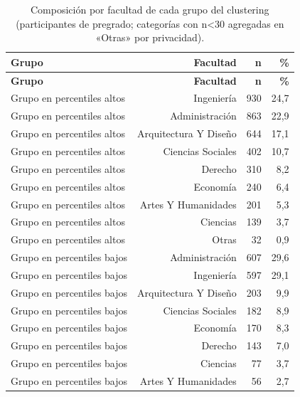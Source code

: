 \begin{longtable}{lrrr}
\caption{Composición por facultad de cada grupo del clustering (participantes de pregrado; categorías con n<30 agregadas en «Otras» por privacidad).}\label{tab:clustering-categorico}\\
\toprule
\textbf{Grupo} & \textbf{Facultad} & \textbf{n} & \textbf{\%} \\
\midrule
\endfirsthead
\toprule \textbf{Grupo} & \textbf{Facultad} & \textbf{n} & \textbf{\%} \\
\midrule
\endhead
\bottomrule
\endfoot
Grupo en percentiles altos & Ingeniería & 930 & 24,7 \\
Grupo en percentiles altos & Administración & 863 & 22,9 \\
Grupo en percentiles altos & Arquitectura Y Diseño & 644 & 17,1 \\
Grupo en percentiles altos & Ciencias Sociales & 402 & 10,7 \\
Grupo en percentiles altos & Derecho & 310 & 8,2 \\
Grupo en percentiles altos & Economía & 240 & 6,4 \\
Grupo en percentiles altos & Artes Y Humanidades & 201 & 5,3 \\
Grupo en percentiles altos & Ciencias & 139 & 3,7 \\
Grupo en percentiles altos & Otras & 32 & 0,9 \\
Grupo en percentiles bajos & Administración & 607 & 29,6 \\
Grupo en percentiles bajos & Ingeniería & 597 & 29,1 \\
Grupo en percentiles bajos & Arquitectura Y Diseño & 203 & 9,9 \\
Grupo en percentiles bajos & Ciencias Sociales & 182 & 8,9 \\
Grupo en percentiles bajos & Economía & 170 & 8,3 \\
Grupo en percentiles bajos & Derecho & 143 & 7,0 \\
Grupo en percentiles bajos & Ciencias & 77 & 3,7 \\
Grupo en percentiles bajos & Artes Y Humanidades & 56 & 2,7 \\
\end{longtable}